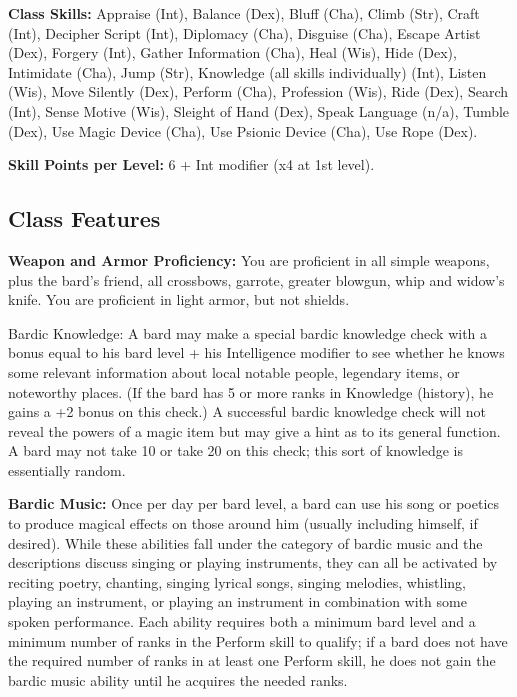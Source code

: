 \documentclass[10pt,a4paper,twocolumn]{d20}
\begin{document}
{\textbf{Class Skills:} Appraise (Int), Balance (Dex), Bluff (Cha), Climb (Str), Craft (Int), Decipher Script (Int), Diplomacy (Cha), Disguise (Cha), Escape Artist (Dex), Forgery (Int), Gather Information (Cha), Heal (Wis), Hide (Dex), Intimidate (Cha), Jump (Str), Knowledge (all skills individually) (Int), Listen (Wis), Move Silently (Dex), Perform (Cha), Profession (Wis), Ride (Dex), Search (Int), Sense Motive (Wis), Sleight of Hand (Dex), Speak Language (n/a), Tumble (Dex), Use Magic Device (Cha), Use Psionic Device (Cha), Use Rope (Dex).

\textbf{Skill Points per Level:} 6 + Int modifier (x4 at 1st level).

\subsection{Class Features}

\textbf{Weapon and Armor Proficiency:} You are proficient in all simple weapons, plus the bard’s friend, all crossbows, garrote, greater blowgun, whip and widow’s knife. You are proficient in light armor, but not shields.

Bardic Knowledge: A bard may make a special bardic knowledge check with a bonus equal to his bard level + his Intelligence modifier to see whether he knows some relevant information about local notable people, legendary items, or noteworthy places. (If the bard has 5 or more ranks in Knowledge (history), he gains a +2 bonus on this check.)
A successful bardic knowledge check will not reveal the powers of a magic item but may give a hint as to its general function. A bard may not take 10 or take 20 on this check; this sort of knowledge is essentially random.


\textbf{Bardic Music:} Once per day per bard level, a bard can use his song or poetics to produce magical effects on those around him (usually including himself, if desired). While these abilities fall under the category of bardic music and the descriptions discuss singing or playing instruments, they can all be activated by reciting poetry, chanting, singing lyrical songs, singing melodies, whistling, playing an instrument, or playing an instrument in combination with some spoken performance. Each ability requires both a minimum bard level and a minimum number of ranks in the Perform skill to qualify; if a bard does not have the required number of ranks in at least one Perform skill, he does not gain the bardic music ability until he acquires the needed ranks.

}
\end{document}
